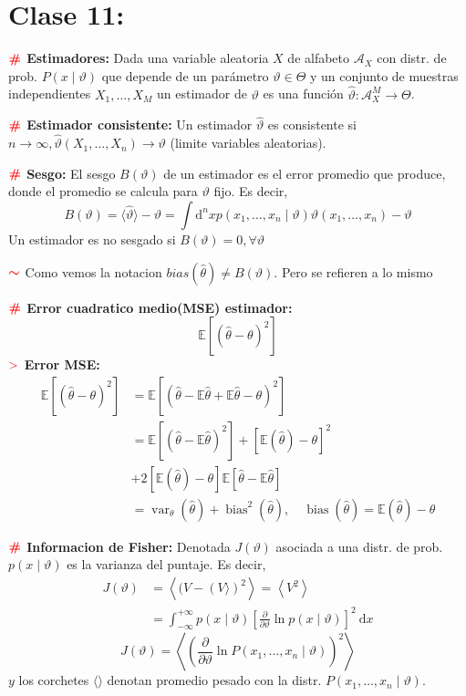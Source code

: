 \documentclass[%
 reprint,
 amsmath,amssymb,
 aps,
]{revtex4-1}
\begin{document}
\section{Clase 11:}

\textbf{$\color{red}{\textbf{\#}}$ Estimadores:} 
Dada una variable aleatoria $X$
de alfabeto $\mathcal{A}_{X}$
con distr. de prob.
$P(x \mid \vartheta)$ que depende de un parámetro $\vartheta \in \Theta$ y un conjunto de muestras independientes $X_{1}, \ldots, X_{M}$ un estimador de $\vartheta$ es una función $\hat{\vartheta}: \mathcal{A}_{X}^{M} \rightarrow \Theta$.

\textbf{$\color{red}{\textbf{\#}}$ Estimador consistente:} 
Un estimador $\hat{\vartheta}$ es consistente si $n \rightarrow \infty, \hat{\vartheta}\left(X_{1}, \ldots, X_{n}\right) \rightarrow \vartheta$ (limite variables aleatorias). 

\textbf{$\color{red}{\textbf{\#}}$ Sesgo:} 
El sesgo $B(\vartheta)$ de un estimador es el error promedio que produce, donde el promedio se calcula para $\vartheta$ fijo. Es decir,
$$
B(\vartheta)= \langle \hat{\vartheta} \rangle -\vartheta=\int \mathrm{d}^{n} x p\left(x_{1}, \ldots, x_{n} \mid \vartheta\right) \hat{\vartheta}\left(x_{1}, \ldots, x_{n}\right) - \vartheta
$$
Un estimador es no sesgado si $B(\vartheta)=0, \forall \vartheta$

\textbf{$\textcolor{red}{\color{red}{\boldsymbol{\sim}}}$} Como vemos la notacion $bias(\hat{\theta}) \neq B(\vartheta)$. Pero se refieren a lo mismo

\textbf{$\color{red}{\textbf{\#}}$ Error cuadratico medio(MSE) estimador:} 
$$\mathbb{E} \left[(\hat{\theta}-\theta)^{2}\right]$$
\textbf{$\textcolor{red}{\mathbf{>}}$ Error MSE:} 
$$
\begin{aligned}
\mathbb{E} \left[(\hat{\theta}-\theta)^{2}\right] &=\mathbb{E} \left[\left(\hat{\theta}-\mathbb{E}  \hat{\theta}+\mathbb{E}  \hat{\theta}-\theta\right)^{2}\right] \\
&=\mathbb{E} \left[\left(\hat{\theta}-\mathbb{E}  \hat{\theta}\right)^{2}\right] 
+
\left[\mathbb{E} (\hat{\theta})-\theta\right]^{2} \\
&+ 2\left[\mathbb{E} (\hat{\theta})-\theta\right] \mathbb{E} \left[\hat{\theta}-\mathbb{E}  \hat{\theta}\right] \\
&=\operatorname{var}_{\theta}(\hat{\theta})+\operatorname{bias}^{2}(\hat{\theta}), \quad \operatorname{bias}(\hat{\theta})= \mathbb{E} (\hat{\theta})-\theta
\end{aligned}
$$

\textbf{$\color{red}{\textbf{\#}}$ Informacion de Fisher:} 
Denotada $J(\vartheta)$ asociada a una distr. de prob. $p(x \mid \vartheta)$ es la varianza
del puntaje. Es decir,
$$
\begin{aligned}
J(\vartheta) &=\left\langle(V-(V\rangle)^{2}\right\rangle =\left\langle V^{2}\right\rangle \\
&=\int_{-\infty}^{+\infty} p(x \mid \vartheta)\left[\frac{\partial}{\partial \vartheta} \ln p(x \mid \vartheta)\right]^{2} \mathrm{~d} x
\end{aligned}
$$
$$
J(\vartheta)=\left\langle\left(\frac{\partial}{\partial \vartheta} \ln P\left(x_{1}, \ldots, x_{n} \mid \vartheta\right)\right)^{2}\right\rangle
$$
$y$ los corchetes  $\langle \rangle$ denotan promedio pesado con la distr. $P\left(x_{1}, \ldots, x_{n} \mid \vartheta\right)$.
\end{document}
